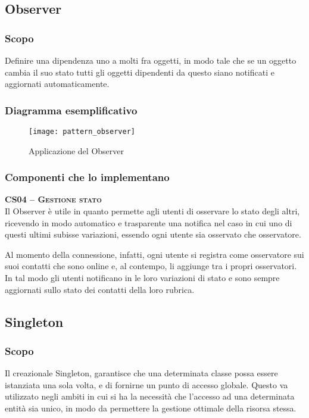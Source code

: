\subsection{Observer}

\subsubsection{Scopo}
Definire una dipendenza uno a molti fra oggetti, in modo tale che se un oggetto cambia il suo stato tutti gli oggetti dipendenti da questo siano notificati e aggiornati automaticamente.

\subsubsection{Diagramma esemplificativo}
\begin{figure}[H]
  \centering
  \texttt{[image: pattern\_observer]}
  \caption{Applicazione del  Observer}\label{fig:observer}
\end{figure}

\subsubsection{Componenti che lo implementano}
\begin{description}
  \item{\scshape\bfseries CS04 -- Gestione stato}\\
Il  Observer è utile in quanto permette agli utenti di osservare lo stato degli altri, ricevendo in modo automatico e trasparente una notifica nel caso in cui uno di questi ultimi subisse variazioni, essendo ogni utente sia osservato che osservatore.

Al momento della connessione, infatti, ogni utente si registra come osservatore sui suoi contatti che sono online e, al contempo, li aggiunge tra i propri osservatori. In tal modo gli utenti notificano in  le loro variazioni di stato e sono sempre aggiornati sullo stato dei contatti della loro rubrica.
\end{description}

\subsection{Singleton}

\subsubsection{Scopo}
Il  creazionale Singleton, garantisce che una determinata classe possa essere istanziata una sola volta, e di fornirne un punto di accesso globale. Questo  va utilizzato negli ambiti in cui si ha la necessità che l'accesso ad una determinata entità sia unico, in modo da permettere la gestione ottimale della risorsa stessa.

